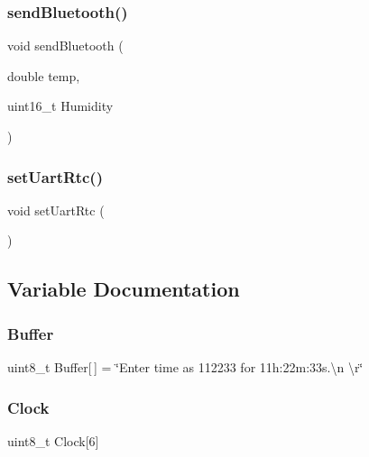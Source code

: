 \mbox{\label{setuartrtc_8c_a791e1a02a5f2e8d4ae3a1378966fa5fc}} 
\subsubsection{send\+Bluetooth()}
{\footnotesize\ttfamily void send\+Bluetooth (\begin{DoxyParamCaption}\item[{double}]{temp,  }\item[{uint16\+\_\+t}]{Humidity }\end{DoxyParamCaption})}

\mbox{\label{setuartrtc_8c_a55c58e7cd34389fff331339901039a1f}} 
\subsubsection{set\+Uart\+Rtc()}
{\footnotesize\ttfamily void set\+Uart\+Rtc (\begin{DoxyParamCaption}{ }\end{DoxyParamCaption})}



\subsection{Variable Documentation}
\mbox{\label{setuartrtc_8c_a2c59318a0685d6cb574309b589b669b2}} 
\subsubsection{Buffer}
{\footnotesize\ttfamily uint8\+\_\+t Buffer[$\,$] = \char`\"{}Enter time as 112233 for 11h\+:22m\+:33s.\textbackslash{}n \textbackslash{}r\char`\"{}}

\mbox{\label{setuartrtc_8c_a8bda290d61e41b33e2e5e7986dd7bd09}} 
\subsubsection{Clock}
{\footnotesize\ttfamily uint8\+\_\+t Clock[6]}


